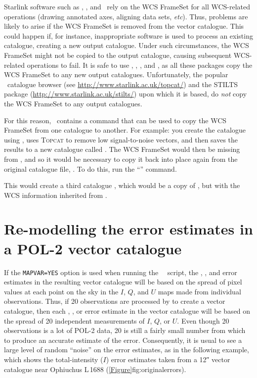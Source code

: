 Starlink software such as \polpack, \Kappa, and \gaia\ rely on the WCS
FrameSet for all WCS-related operations (drawing annotated axes, aligning
data sets, \emph{etc}). Thus, problems are likely to arise if the WCS FrameSet
is removed from the vector catalogue. This could happen if, for instance,
inappropriate software is used to process an existing catalogue, creating a
new output catalogue. Under such circumstances, the WCS FrameSet might
not be copied to the output catalogue, causing subsequent WCS-related
operations to fail. It is safe to use \POLPACK, \KAPPA, \GAIA, and
\CURSAref, as all these packages copy the WCS
FrameSet to any new output catalogues. Unfortunately, the popular
\topcat\ catalogue browser (see
\url{http://www.starlink.ac.uk/topcat/}) and the STILTS package
(\url{http://www.starlink.ac.uk/stilts/}) upon which it is based, do
\emph{not} copy the WCS FrameSet to any output catalogues.

For this reason, \POLPACK\ contains a command that can be used to copy the
WCS FrameSet from one catalogue to another.  For example: you create
the catalogue  using \poltwomap, uses \textsc{Topcat}
to remove low signal-to-noise vectors, and then saves the results to a new catalogue
called . The WCS FrameSet would then be missing from ,
and so it would be necessary to copy it back into place again from the original catalogue
file, . To do this, run the ``''
command.

\begin{terminalv}
\end{terminalv}

This would create a third catalogue , which would be a copy of
, but with the WCS information inherited from .


\section{Re-modelling the error estimates in a POL-2 vector catalogue}

If the \texttt{MAPVAR=YES} option is used when running the \smurf\ \poltwomap\ script,
the , , and  error estimates in the resulting vector catalogue will be based
on the spread of pixel values at each point on the sky in the $I$,
$Q$, and $U$ maps made from individual observations. Thus, if 20 observations are
processed by  to create a vector catalogue, then each
, , or  error estimate in the vector catalogue will be based on the spread of 20
independent measurements of $I$, $Q$, or $U$.  Even though 20 observations is a lot of
POL-2 data, 20 is still a fairly small number from which to produce an accurate
estimate of the error. Consequently, it is usual to see a large level of random
``noise'' on the error estimates, as in the following example, which
shows the total-intensity ($I$) error estimates taken from a 12\si{\arcsecond} vector
catalogue near Ophiuchus L\,1688 (\cref{Figure}{fig:originalerrors}{}).


